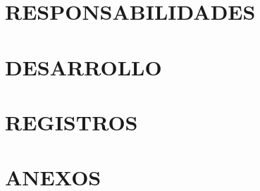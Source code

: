 \documentclass[a4paper,11pt,oneside,po,lpo]{INF-GF}
\begin{document}
\section{RESPONSABILIDADES}

\section{DESARROLLO}

\section{REGISTROS}

\section{ANEXOS}
\end{document}
